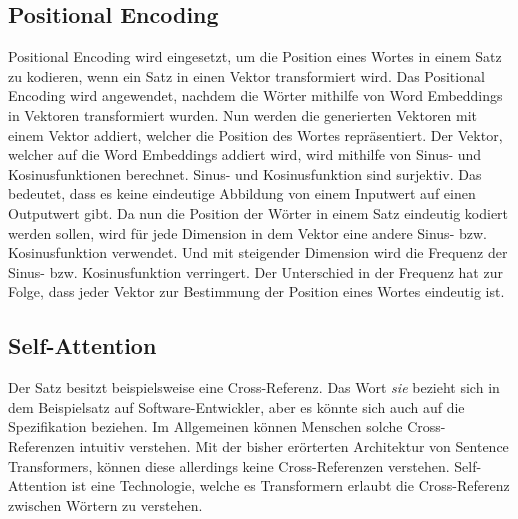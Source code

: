 \subsection{Positional Encoding}
\label{chap:positional-encoding}
Positional Encoding wird eingesetzt, um die Position eines Wortes in einem Satz zu kodieren, wenn ein Satz in einen Vektor transformiert wird.
Das Positional Encoding wird angewendet, nachdem die Wörter mithilfe von Word Embeddings in Vektoren transformiert wurden.
Nun werden die generierten Vektoren mit einem Vektor addiert, welcher die Position des Wortes repräsentiert.
Der Vektor, welcher auf die Word Embeddings addiert wird, wird mithilfe von Sinus- und Kosinusfunktionen berechnet.
Sinus- und Kosinusfunktion sind surjektiv.
Das bedeutet, dass es keine eindeutige Abbildung von einem Inputwert auf einen Outputwert gibt.
Da nun die Position der Wörter in einem Satz eindeutig kodiert werden sollen, wird für jede Dimension in dem Vektor eine andere Sinus- bzw. Kosinusfunktion verwendet.
Und mit steigender Dimension wird die Frequenz der Sinus- bzw. Kosinusfunktion verringert.
Der Unterschied in der Frequenz hat zur Folge, dass jeder Vektor zur Bestimmung der Position eines Wortes eindeutig ist.

\subsection{Self-Attention}
\label{chap:self-attention}
Der Satz  besitzt beispielsweise eine Cross-Referenz.
Das Wort \textit{sie} bezieht sich in dem Beispielsatz auf Software-Entwickler, aber es könnte sich auch auf die Spezifikation beziehen.
Im Allgemeinen können Menschen solche Cross-Referenzen intuitiv verstehen.
Mit der bisher erörterten Architektur von Sentence Transformers, können diese allerdings keine Cross-Referenzen verstehen.
Self-Attention ist eine Technologie, welche es Transformern erlaubt die Cross-Referenz zwischen Wörtern zu verstehen.\\

